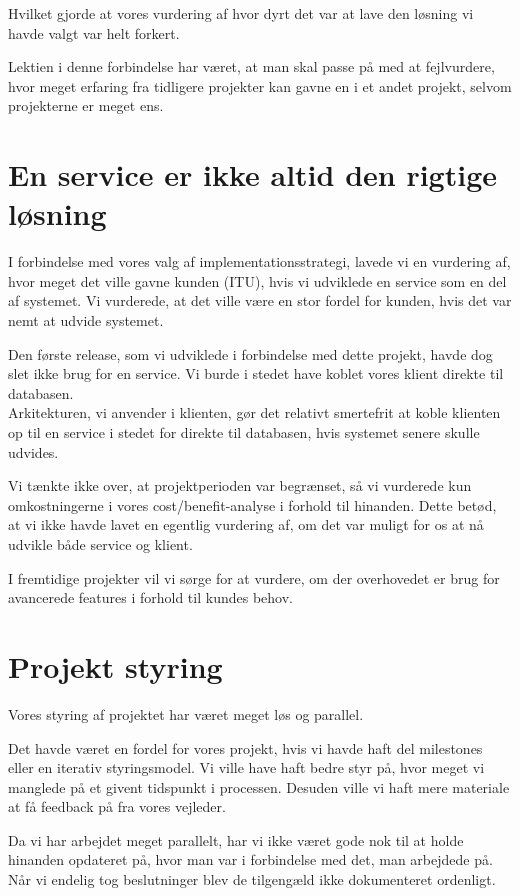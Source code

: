 Hvilket gjorde at vores vurdering af hvor dyrt det var at lave den løsning vi havde valgt var helt forkert.

Lektien i denne forbindelse har været, at man skal passe på med at fejlvurdere, hvor meget erfaring fra tidligere projekter kan gavne en i et andet projekt, selvom projekterne er meget ens.

\section{En service er ikke altid den rigtige løsning}
\label{Lessons_Service}
I forbindelse med vores valg af implementationsstrategi, lavede vi en vurdering af, hvor meget det ville gavne kunden (ITU), hvis vi udviklede en service som en del af systemet. Vi vurderede, at det ville være en stor fordel for kunden, hvis det var nemt at udvide systemet.

Den første release, som vi udviklede i forbindelse med dette projekt, havde dog slet ikke brug for en service. Vi burde i stedet have koblet vores klient direkte til databasen. 
\\Arkitekturen, vi anvender i klienten, gør det relativt smertefrit at koble klienten op til en service i stedet for direkte til databasen, hvis systemet senere skulle udvides.

Vi tænkte ikke over, at projektperioden var begrænset, så vi vurderede kun omkostningerne i vores cost/benefit-analyse i forhold til hinanden. Dette betød, at vi ikke havde lavet en egentlig vurdering af, om det var muligt for os at nå udvikle både service og klient.

I fremtidige projekter vil vi sørge for at vurdere, om der overhovedet er brug for avancerede features i forhold til kundes behov.

\section{Projekt styring}
\label{Lessons_Styring}
Vores styring af projektet har været meget løs og parallel. 

Det havde været en fordel for vores projekt, hvis vi havde haft del milestones eller en iterativ styringsmodel. Vi ville have haft bedre styr på, hvor meget vi manglede på et givent tidspunkt i processen. Desuden ville vi haft mere materiale at få feedback på fra vores vejleder.

Da vi har arbejdet meget parallelt, har vi ikke været gode nok til at holde hinanden opdateret på, hvor man var i forbindelse med det, man arbejdede på. Når vi endelig tog beslutninger blev de tilgengæld ikke dokumenteret ordenligt.


